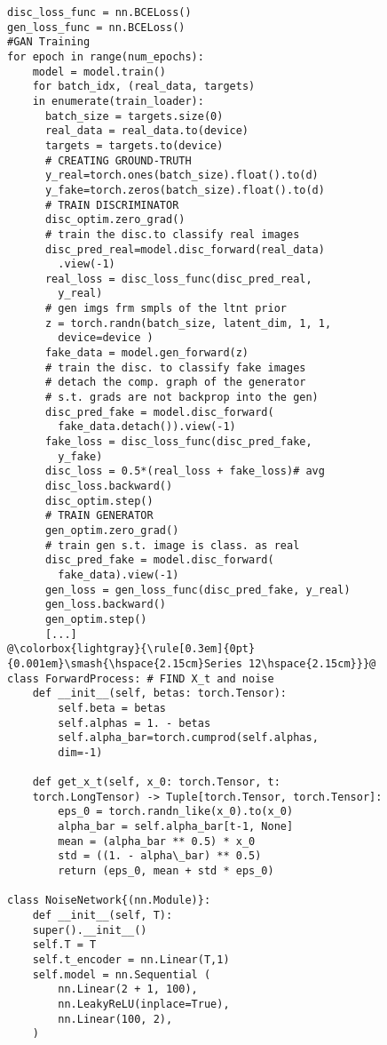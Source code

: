 \begin{lstlisting}[style=mypython]
disc_loss_func = nn.BCELoss()
gen_loss_func = nn.BCELoss() 
#GAN Training
for epoch in range(num_epochs):   
    model = model.train()
    for batch_idx, (real_data, targets) 
    in enumerate(train_loader):
      batch_size = targets.size(0)
      real_data = real_data.to(device)
      targets = targets.to(device)
      # CREATING GROUND-TRUTH
      y_real=torch.ones(batch_size).float().to(d)
      y_fake=torch.zeros(batch_size).float().to(d)
      # TRAIN DISCRIMINATOR
      disc_optim.zero_grad()
      # train the disc.to classify real images
      disc_pred_real=model.disc_forward(real_data)
        .view(-1)
      real_loss = disc_loss_func(disc_pred_real,
        y_real)
      # gen imgs frm smpls of the ltnt prior
      z = torch.randn(batch_size, latent_dim, 1, 1,
        device=device )
      fake_data = model.gen_forward(z)
      # train the disc. to classify fake images
      # detach the comp. graph of the generator
      # s.t. grads are not backprop into the gen)
      disc_pred_fake = model.disc_forward(
        fake_data.detach()).view(-1)
      fake_loss = disc_loss_func(disc_pred_fake, 
        y_fake)
      disc_loss = 0.5*(real_loss + fake_loss)# avg
      disc_loss.backward()
      disc_optim.step()
      # TRAIN GENERATOR
      gen_optim.zero_grad()
      # train gen s.t. image is class. as real
      disc_pred_fake = model.disc_forward(
        fake_data).view(-1)
      gen_loss = gen_loss_func(disc_pred_fake, y_real)
      gen_loss.backward()
      gen_optim.step()
      [...]
@\colorbox{lightgray}{\rule[0.3em]{0pt}{0.001em}\smash{\hspace{2.15cm}Series 12\hspace{2.15cm}}}@
class ForwardProcess: # FIND X_t and noise
    def __init__(self, betas: torch.Tensor):
        self.beta = betas
        self.alphas = 1. - betas
        self.alpha_bar=torch.cumprod(self.alphas,
        dim=-1)

    def get_x_t(self, x_0: torch.Tensor, t: 
    torch.LongTensor) -> Tuple[torch.Tensor, torch.Tensor]:
        eps_0 = torch.randn_like(x_0).to(x_0)
        alpha_bar = self.alpha_bar[t-1, None]
        mean = (alpha_bar ** 0.5) * x_0
        std = ((1. - alpha\_bar) ** 0.5)
        return (eps_0, mean + std * eps_0) 

class NoiseNetwork{(nn.Module)}:
    def __init__(self, T):
    super().__init__()
    self.T = T
    self.t_encoder = nn.Linear(T,1)
    self.model = nn.Sequential (
        nn.Linear(2 + 1, 100),
        nn.LeakyReLU(inplace=True),
        nn.Linear(100, 2),
    )


\end{lstlisting}
